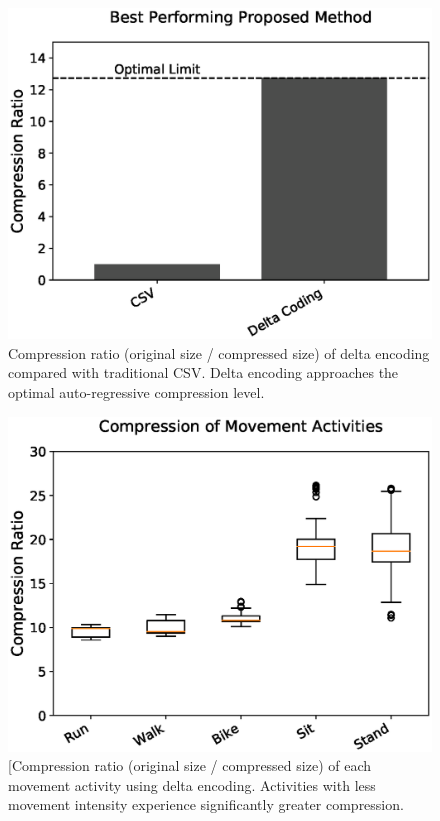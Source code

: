 \documentclass[journal]{IEEEtran}
\begin{document}
\begin{figure}

  \includegraphics[width=\linewidth]{diff.eps}
  \caption{Compression ratio (original size / compressed size) of delta encoding compared with traditional CSV. Delta encoding approaches the optimal auto-regressive compression level.}
  \label{fig:main_results}
  
\end{figure}
\begin{figure}

  \includegraphics[width=\linewidth]{movement.eps}
  \caption{[Compression ratio (original size / compressed size) of each movement activity using delta encoding. Activities with less movement intensity experience significantly greater compression.}
  \label{fig:movements}
  
\end{figure}
\end{document}
